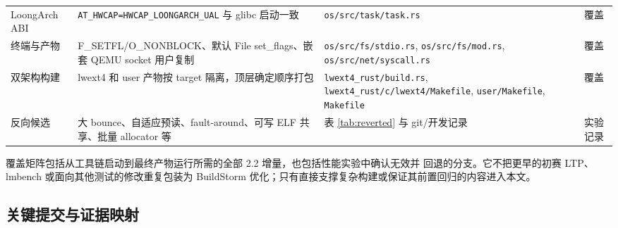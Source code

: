\documentclass[UTF8,zihao=-4]{ctexart}
\newcommand{\code}{\nolinkurl}
\begin{document}
\begin{longtable}{p{}p{}p{}p{}}
LoongArch ABI & \code{AT_HWCAP=HWCAP_LOONGARCH_UAL} 与 glibc 启动一致 & \code{os/src/task/task.rs} & 覆盖 \\
终端与产物 & F\_SETFL/O\_NONBLOCK、默认 File set\_flags、嵌套 QEMU socket 用户复制 & \code{os/src/fs/stdio.rs}, \code{os/src/fs/mod.rs}, \code{os/src/net/syscall.rs} & 覆盖 \\
双架构构建 & lwext4 和 user 产物按 target 隔离，顶层确定顺序打包 & \code{lwext4_rust/build.rs}, \code{lwext4_rust/c/lwext4/Makefile}, \code{user/Makefile}, \code{Makefile} & 覆盖 \\
反向候选 & 大 bounce、自适应预读、fault-around、可写 ELF 共享、批量 allocator 等 & 表 \ref{tab:reverted} 与 git/开发记录 & 实验记录 \\
\bottomrule
\end{longtable}

覆盖矩阵包括从工具链启动到最终产物运行所需的全部 2.2 增量，也包括性能实验中确认无效并
回退的分支。它不把更早的初赛 LTP、lmbench 或面向其他测试的修改重复包装为 BuildStorm
优化；只有直接支撑复杂构建或保证其前置回归的内容进入本文。

\subsection{关键提交与证据映射}
\end{document}

